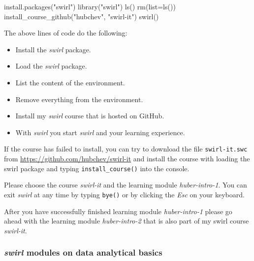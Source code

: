 \documentclass[
  12pt,
  oneside]{book}
\newenvironment{Shaded}{\begin{snugshade}}{\end{snugshade}}
\newcommand{\AttributeTok}[1]{\textcolor[rgb]{0.77,0.63,0.00}{#1}}
\newcommand{\FunctionTok}[1]{\textcolor[rgb]{0.00,0.00,0.00}{#1}}
\newcommand{\NormalTok}[1]{#1}
\newcommand{\StringTok}[1]{\textcolor[rgb]{0.31,0.60,0.02}{#1}}
\providecommand{\tightlist}{%
  \setlength{\itemsep}{0pt}\setlength{\parskip}{0pt}}
\theoremstyle{definition}
\theoremstyle{definition}
\theoremstyle{definition}
\theoremstyle{definition}
\theoremstyle{remark}
\begin{document}
\begin{Shaded}
\begin{Highlighting}[]
\FunctionTok{install.packages}\NormalTok{(}\StringTok{"swirl"}\NormalTok{)}
\FunctionTok{library}\NormalTok{(}\StringTok{"swirl"}\NormalTok{)}
\FunctionTok{ls}\NormalTok{()}
\FunctionTok{rm}\NormalTok{(}\AttributeTok{list=}\FunctionTok{ls}\NormalTok{())}
\FunctionTok{install\_course\_github}\NormalTok{(}\StringTok{"hubchev"}\NormalTok{, }\StringTok{"swirl{-}it"}\NormalTok{)}
\FunctionTok{swirl}\NormalTok{()}
\end{Highlighting}
\end{Shaded}

The above lines of code do the following:

\begin{itemize}
\tightlist
\item
  Install the \emph{swirl} package.
\item
  Load the \emph{swirl} package.
\item
  List the content of the environment.
\item
  Remove everything from the environment.
\item
  Install my \emph{swirl} course that is hosted on GitHub.
\item
  With \emph{swirl} you start \emph{swirl} and your learning experience.
\end{itemize}

If the course has failed to install, you can try to download the file \texttt{swirl-it.swc} from \url{https://github.com/hubchev/swirl-it} and install the course with loading the swirl package and typing \texttt{install\_course()} into the console.

Please choose the course \emph{swirl-it} and the learning module \emph{huber-intro-1}.
You can exit \emph{swirl} at any time by typing \texttt{bye()} or by clicking the \emph{Esc} on your keyboard.

After you have successfully finished learning module \emph{huber-intro-1} please go ahead with the learning module \emph{huber-intro-2} that is also part of my swirl course \emph{swirl-it}.

\hypertarget{swirl-modules-on-data-analytical-basics}{%
\subsubsection*{\texorpdfstring{\emph{swirl} modules on data analytical basics}{swirl modules on data analytical basics}}\label{swirl-modules-on-data-analytical-basics}}
\end{document}

